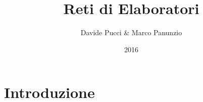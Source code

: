 \documentclass{report}
\title{Reti di Elaboratori}
\author{Davide Pucci & Marco Panunzio}
\date{2016}
\begin{document}
\maketitle

\tableofcontents

\chapter{Introduzione}

\end{document}
